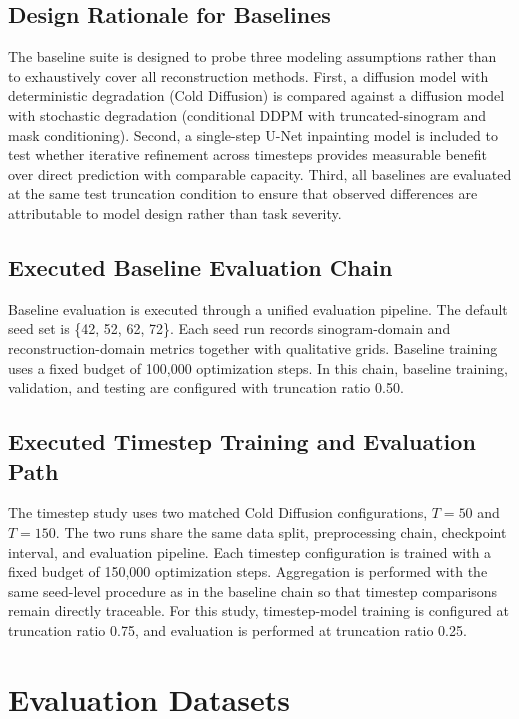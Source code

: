 \subsection{Design Rationale for Baselines}

The baseline suite is designed to probe three modeling assumptions rather than to exhaustively cover all reconstruction methods. First, a diffusion model with deterministic degradation (Cold Diffusion) is compared against a diffusion model with stochastic degradation (conditional DDPM with truncated-sinogram and mask conditioning). Second, a single-step U-Net inpainting model is included to test whether iterative refinement across timesteps provides measurable benefit over direct prediction with comparable capacity. Third, all baselines are evaluated at the same test truncation condition to ensure that observed differences are attributable to model design rather than task severity.

\subsection{Executed Baseline Evaluation Chain}

Baseline evaluation is executed through a unified evaluation pipeline. The default seed set is \{42, 52, 62, 72\}. Each seed run records sinogram-domain and reconstruction-domain metrics together with qualitative grids. Baseline training uses a fixed budget of 100,000 optimization steps.
In this chain, baseline training, validation, and testing are configured with truncation ratio 0.50.

\subsection{Executed Timestep Training and Evaluation Path}

The timestep study uses two matched Cold Diffusion configurations, \(T=50\) and \(T=150\). The two runs share the same data split, preprocessing chain, checkpoint interval, and evaluation pipeline. Each timestep configuration is trained with a fixed budget of 150,000 optimization steps. Aggregation is performed with the same seed-level procedure as in the baseline chain so that timestep comparisons remain directly traceable.
For this study, timestep-model training is configured at truncation ratio 0.75, and evaluation is performed at truncation ratio 0.25.

\section{Evaluation Datasets}


